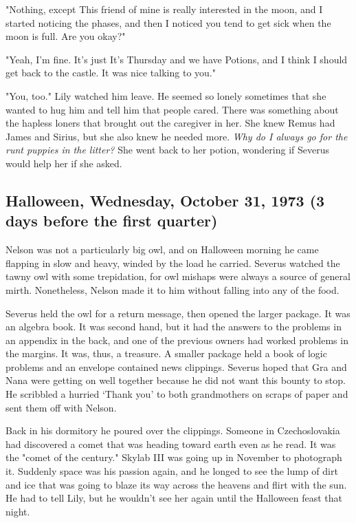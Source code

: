 "Nothing, except{\el} This friend of mine is really interested in the moon, and I started noticing the phases, and then I noticed you tend to get sick when the moon is full. Are you okay?"

"Yeah, I'm fine. It's just{\el} It's Thursday and we have Potions, and I think I should get back to the castle. It was nice talking to you."

"You, too." Lily watched him leave. He seemed so lonely sometimes that she wanted to hug him and tell him that people cared. There was something about the hapless loners that brought out the caregiver in her. She knew Remus had James and Sirius, but she also knew he needed more. \emph{Why do I always go for the runt puppies in the litter?} She went back to her potion, wondering if Severus would help her if she asked.

\subsection{Halloween, Wednesday, October 31, 1973 (3 days before the first quarter)}

Nelson was not a particularly big owl, and on Halloween morning he came flapping in slow and heavy, winded by the load he carried. Severus watched the tawny owl with some trepidation, for owl mishaps were always a source of general mirth. Nonetheless, Nelson made it to him without falling into any of the food.

Severus held the owl for a return message, then opened the larger package. It was an algebra book. It was second hand, but it had the answers to the problems in an appendix in the back, and one of the previous owners had worked problems in the margins. It was, thus, a treasure. A smaller package held a book of logic problems and an envelope contained news clippings. Severus hoped that Gra and Nana were getting on well together because he did not want this bounty to stop. He scribbled a hurried `Thank you' to both grandmothers on scraps of paper and sent them off with Nelson.

Back in his dormitory he poured over the clippings. Someone in Czechoslovakia had discovered a comet that was heading toward earth even as he read. It was the "comet of the century." Skylab III was going up in November to photograph it. Suddenly space was his passion again, and he longed to see the lump of dirt and ice that was going to blaze its way across the heavens and flirt with the sun. He had to tell Lily, but he wouldn't see her again until the Halloween feast that night.

